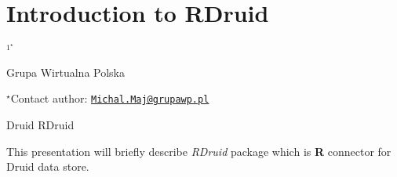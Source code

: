 \documentclass[\main/boa.tex]{subfiles}
\begin{document}
\section{Introduction to RDruid}

\begin{center}
  {\bf {}$^{1^\star}$}
\end{center}

\vskip 0.3cm

\begin{affiliations}
\begin{enumerate}
\begin{minipage}{0.915\textwidth}
\centering
\item Grupa Wirtualna Polska \\[-2pt]
\end{minipage}
\end{enumerate}
$^\star$Contact author: \href{mailto:Michal.Maj@grupawp.pl}{\nolinkurl{Michal.Maj@grupawp.pl}}\\
\end{affiliations}

\vskip 0.5cm

\begin{minipage}{0.915\textwidth}
\keywords Druid
\packages RDruid
\end{minipage}

\vskip 0.8cm

This presentation will briefly describe \emph{RDruid} package which is
\textbf{R} connector for Druid data store.
\end{document}
